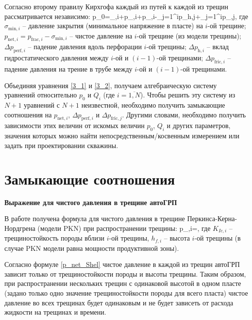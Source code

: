 Согласно второму правилу Кирхгофа каждый из путей к каждой из трещин рассматривается независимо:
\beq\label{3_2}
p_0=\sigma_{,i}+p_{,i}+\Delta p_{,i}-\sum_{j=1}^{i}{\Delta p_{h,j}}+\sum_{j=1}^{i}\Delta p_{,j},
\eeq
где $\sigma_{\text{min},i}$ -- давление закрытия (минимальное напряжение в пласте) на $i$-ой трещине;\newline
$p_{\text{net},i}=p_{\text{frac},i}-\sigma_{\text{min},i}$ -- чистое давление на $i$-ой трещине (из модели трещины);\newline
$\Delta p_{\text{perf},i}$ -- падение давления вдоль перфорации $i$-ой трещины;\newline
$\Delta p_{\text{h},i}$ -- вклад гидростатического давления между $i$-ой и $(i-1)$-ой трещинами;\newline
$\Delta p_{\text{fric},i}$ -- падение давления на трение в трубе между $i$-ой и $(i-1)$-ой трещинами.

Объединяя уравнения \eqref{3_1} и \eqref{3_2}, получаем алгебраическую систему уравнений относительно $p_0$ и $Q_i$ (где $i=\overline{1, N}$).
Чтобы решить эту систему из $N+1$ уравнений с $N+1$ неизвестной, необходимо получить замыкающие соотношения на $p_{\text{net},i}$, $\Delta p_{\text{perf},i}$ и $\Delta p_{\text{fric},j}$.
Другими словами, необходимо получить зависимости этих величин от искомых величин $p_0$, $Q_i$ и других параметров, значения которых можно найти непосредственным/косвенным измерением или задать при проектировании скважины.

\section{Замыкающие соотношения}
\vspace*{-5mm}

\textbf{Выражение для чистого давления в трещине автоГРП}

В работе \cite{kabanova_shel} получена формула для чистого давления в трещине Перкинса-Керна-Нордгрена (модели PKN) при распространении трещины:
\beq\label{p_net_Shel}
p_{,i}=,
\eeq
где $K_{Ic,i}$ -- трещиностойкость породы вблизи $i$-ой трещины,\newline
$h_{f,i}$ -- высота $i$-ой трещины (в случае PKN модели равна мощности продуктивной зоны).

Согласно формуле \eqref{p_net_Shel} чистое давление в каждой из трещин автоГРП зависит только от трещиностойкости породы и высоты трещины.
Таким образом, при распространении нескольких трещин с одинаковой высотой в одном пласте (задано только одно значение трещиностойкости породы для всего пласта) чистое давление во всех трещинах будет одинаковым и не будет зависеть от расхода жидкости на трещинах и времени.

